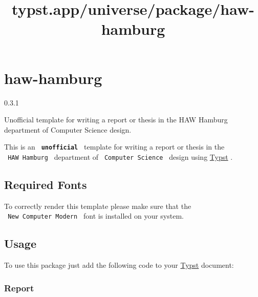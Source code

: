 \title{typst.app/universe/package/haw-hamburg}

\label{banner}
\section{haw-hamburg}\label{haw-hamburg}

{ 0.3.1 }

Unofficial template for writing a report or thesis in the HAW Hamburg
department of Computer Science design.

\label{readme}
This is an \textbf{\texttt{\ unofficial\ }} template for writing a
report or thesis in the \texttt{\ HAW\ Hamburg\ } department of
\texttt{\ Computer\ Science\ } design using
\href{https://github.com/typst/typst}{Typst} .

\subsection{Required Fonts}\label{required-fonts}

To correctly render this template please make sure that the
\texttt{\ New\ Computer\ Modern\ } font is installed on your system.

\subsection{Usage}\label{usage}

To use this package just add the following code to your
\href{https://github.com/typst/typst}{Typst} document:

\subsubsection{Report}\label{report}

\begin{Shaded}
\begin{Highlighting}[]

\NormalTok{)}
\end{Highlighting}
\end{Shaded}

